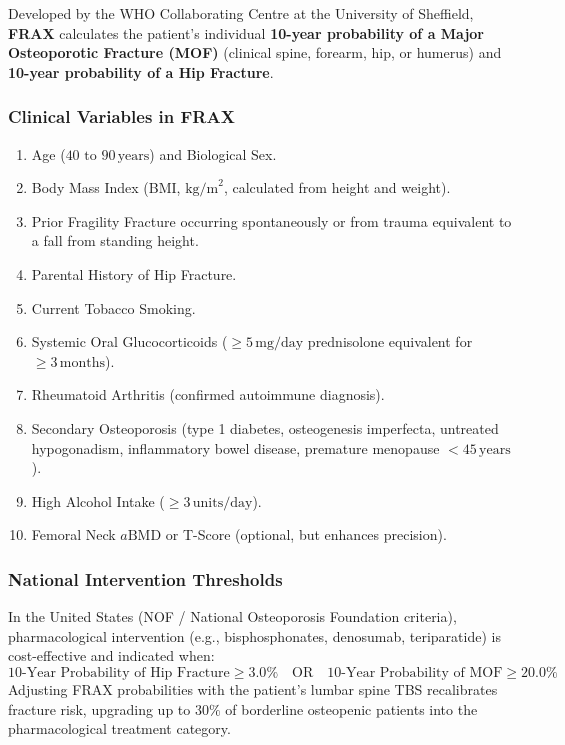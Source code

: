 \documentclass[11pt,a4paper]{article}
\begin{document}
Developed by the WHO Collaborating Centre at the University of Sheffield, \textbf{FRAX} calculates the patient's individual \textbf{10-year probability of a Major Osteoporotic Fracture (MOF)} (clinical spine, forearm, hip, or humerus) and \textbf{10-year probability of a Hip Fracture}.

\subsubsection{Clinical Variables in FRAX}
\begin{enumerate}[leftmargin=*]
    \item Age ($40\text{ to }90\,\text{years}$) and Biological Sex.
    \item Body Mass Index (BMI, $\text{kg/m}^2$, calculated from height and weight).
    \item Prior Fragility Fracture occurring spontaneously or from trauma equivalent to a fall from standing height.
    \item Parental History of Hip Fracture.
    \item Current Tobacco Smoking.
    \item Systemic Oral Glucocorticoids ($\ge 5\,\text{mg/day}$ prednisolone equivalent for $\ge 3\,\text{months}$).
    \item Rheumatoid Arthritis (confirmed autoimmune diagnosis).
    \item Secondary Osteoporosis (type 1 diabetes, osteogenesis imperfecta, untreated hypogonadism, inflammatory bowel disease, premature menopause $< 45\,\text{years}$).
    \item High Alcohol Intake ($\ge 3\,\text{units/day}$).
    \item Femoral Neck $a\text{BMD}$ or T-Score (optional, but enhances precision).
\end{enumerate}

\subsubsection{National Intervention Thresholds}
In the United States (NOF / National Osteoporosis Foundation criteria), pharmacological intervention (e.g., bisphosphonates, denosumab, teriparatide) is cost-effective and indicated when:
\begin{equation}
    \text{10-Year Probability of Hip Fracture} \ge \mathbf{3.0\%} \quad \text{OR} \quad \text{10-Year Probability of MOF} \ge \mathbf{20.0\%}
\end{equation}
Adjusting FRAX probabilities with the patient's lumbar spine TBS recalibrates fracture risk, upgrading up to $30\%$ of borderline osteopenic patients into the pharmacological treatment category.
\end{document}
